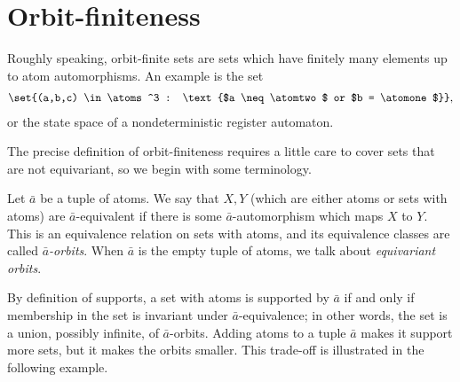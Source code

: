 
\section{Orbit-finiteness}
\label{sec:orbit-finite-sets}
Roughly speaking, orbit-finite sets are sets which have finitely many elements up to atom automorphisms. An example is the set 
\begin{align*}
	\set{(a,b,c) \in \atoms^3 : \text{$a \neq \atomtwo$ or $b = \atomone$}},
\end{align*}
or the state space of a nondeterministic register automaton.



The precise definition of orbit-finiteness requires a little care to cover sets that are not equivariant, so we begin with some terminology.

 
\begin{definition}[Orbits] Let $\bar a$ be a tuple of atoms. We say that $X,Y$ (which are either atoms or sets with atoms) are $\bar a$-equivalent if there is some $\bar a$-automorphism which maps $X$ to $Y$. This is an equivalence relation on sets with atoms, and its equivalence classes are called \emph{$\bar a$-orbits}. When $\bar a$ is the empty tuple of atoms, we talk about \emph{equivariant orbits}. 
\end{definition}


By definition of supports, a set with atoms is supported by $\bar a$ if and only if membership in the set is invariant under $\bar a$-equivalence; in other words, the set is a union, possibly infinite, of $\bar a$-orbits. Adding atoms to a tuple $\bar a$ makes it support more sets, but it makes the orbits smaller. This trade-off is illustrated in the following example. 

